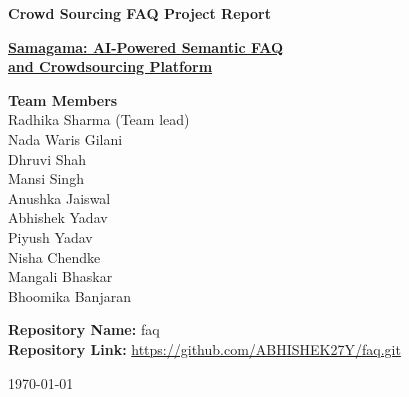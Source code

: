 \documentclass[12pt,a4paper]{article}
\begin{document}
\begin{titlepage}
    \begin{center}
        \begin{minipage}{0.4\textwidth}
            \begin{flushleft}
            \end{flushleft}
        \end{minipage}
        \begin{minipage}{0.5\textwidth}
            \begin{flushright}
            \end{flushright}
        \end{minipage}
        
        \vspace*{2cm}
        
        {\Huge \textbf{Crowd Sourcing FAQ Project Report}}
        
        \vspace{2cm}
        
        {\Large \textbf{\underline{Samagama: AI-Powered Semantic FAQ}}} \\
        \vspace{0.2cm}
        {\Large \textbf{\underline{and Crowdsourcing Platform}}}
        
        \vspace{1.5cm}
        {\Large \textbf{Team Members}} \\
        \vspace{0.5cm}
        {\Large
        Radhika Sharma (Team lead) \\
        Nada Waris Gilani \\
        Dhruvi Shah \\
        Mansi Singh \\
        Anushka Jaiswal \\
        Abhishek Yadav \\
        Piyush Yadav \\
        Nisha Chendke \\
        Mangali Bhaskar \\
        Bhoomika Banjaran
        }
        
        \vfill
        
        \textbf{Repository Name:} faq \\
        \textbf{Repository Link:} \url{https://github.com/ABHISHEK27Y/faq.git}
        
        \vspace{1cm}
        
        \Large \today
        
    \end{center}
\end{titlepage}
\end{document}
